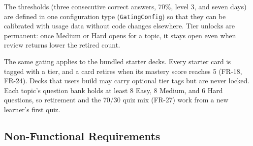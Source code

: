 \documentclass[12pt,letterpaper]{article}
\begin{document}
The thresholds (three consecutive correct answers, 70\%, level 3, and seven days) are
defined in one configuration type (\texttt{GatingConfig}) so that they can be
calibrated with usage data without code changes elsewhere. Tier unlocks are
permanent: once Medium or Hard opens for a topic, it stays open even when review
returns lower the retired count.

The same gating applies to the bundled starter decks. Every starter card is tagged with
a tier, and a card retires when its mastery score reaches 5 (FR-18, FR-24). Decks that
users build may carry optional tier tags but are never locked. Each topic's question
bank holds at least 8 Easy, 8 Medium, and 6 Hard questions, so retirement and the
70/30 quiz mix (FR-27) work from a new learner's first quiz.

\subsection{Non-Functional Requirements}
\end{document}

